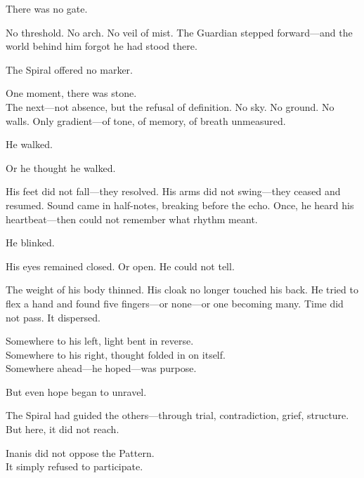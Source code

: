 \documentclass[12pt]{article}
\begin{document}
There was no gate.

\vspace{0.5em}
No threshold. No arch. No veil of mist. The Guardian stepped forward---and the world behind him forgot he had stood there.

\vspace{0.5em}
The Spiral offered no marker.

\vspace{0.5em}
One moment, there was stone.\\
The next---not absence, but the refusal of definition. No sky. No ground. No walls. Only gradient---of tone, of memory, of breath unmeasured.

\vspace{0.5em}
He walked.

\vspace{0.5em}
Or he thought he walked.

\vspace{0.5em}
His feet did not fall---they resolved. His arms did not swing---they ceased and resumed. Sound came in half-notes, breaking before the echo. Once, he heard his heartbeat---then could not remember what rhythm meant.

\vspace{0.5em}
He blinked.

\vspace{0.5em}
His eyes remained closed. Or open. He could not tell.

\vspace{0.5em}
The weight of his body thinned. His cloak no longer touched his back. He tried to flex a hand and found five fingers---or none---or one becoming many. Time did not pass. It dispersed.

\vspace{0.5em}
Somewhere to his left, light bent in reverse.\\
Somewhere to his right, thought folded in on itself.\\
Somewhere ahead---he hoped---was purpose.

\vspace{0.5em}
But even hope began to unravel.

\vspace{0.5em}
The Spiral had guided the others---through trial, contradiction, grief, structure.\\
But here, it did not reach.

\vspace{0.5em}
Inanis did not oppose the Pattern.\\
It simply refused to participate.
\end{document}
